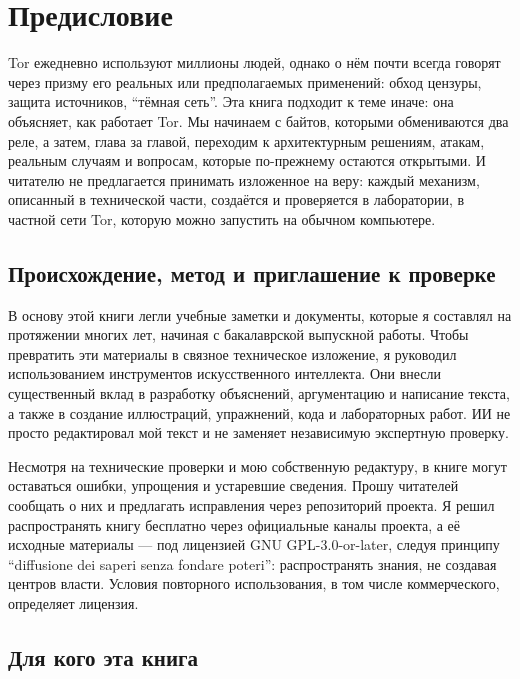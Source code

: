 \chapter{Предисловие}

Tor ежедневно используют миллионы людей, однако о нём почти всегда говорят через призму его реальных или предполагаемых применений: обход цензуры, защита источников, \enquote{тёмная сеть}. Эта книга подходит к теме иначе: она объясняет, как работает Tor. Мы начинаем с байтов, которыми обмениваются два реле, а затем, глава за главой, переходим к архитектурным решениям, атакам, реальным случаям и вопросам, которые по-прежнему остаются открытыми. И читателю не предлагается принимать изложенное на веру: каждый механизм, описанный в технической части, создаётся и проверяется в лаборатории, в частной сети Tor, которую можно запустить на обычном компьютере.

\section*{Происхождение, метод и приглашение к проверке}

В основу этой книги легли учебные заметки и документы, которые я составлял на протяжении многих лет, начиная с бакалаврской выпускной работы. Чтобы превратить эти материалы в связное техническое изложение, я руководил использованием инструментов искусственного интеллекта. Они внесли существенный вклад в разработку объяснений, аргументацию и написание текста, а также в создание иллюстраций, упражнений, кода и лабораторных работ. ИИ не просто редактировал мой текст и не заменяет независимую экспертную проверку.

Несмотря на технические проверки и мою собственную редактуру, в книге могут оставаться ошибки, упрощения и устаревшие сведения. Прошу читателей сообщать о них и предлагать исправления через репозиторий проекта. Я решил распространять книгу бесплатно через официальные каналы проекта, а её исходные материалы --- под лицензией GNU GPL-3.0-or-later, следуя принципу \enquote{diffusione dei saperi senza fondare poteri}: распространять знания, не создавая центров власти. Условия повторного использования, в том числе коммерческого, определяет лицензия.

\section*{Для кого эта книга}

